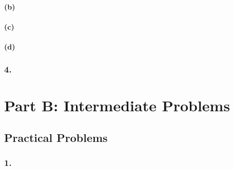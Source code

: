 \documentclass[12pt]{report}
\begin{document}
\subsubsection*{(b)}

\subsubsection*{(c)}

\subsubsection*{(d)}

\subsection*{4.}

\chapter*{Part B: Intermediate Problems}
\section*{Practical Problems}
\subsection*{1.}
\end{document}
